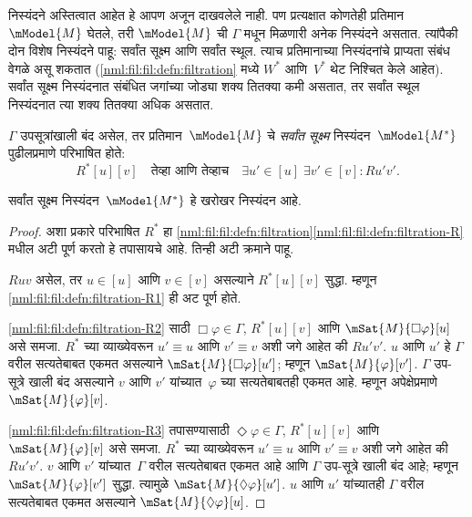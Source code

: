 निस्यंदने अस्तित्वात आहेत हे आपण अजून दाखवलेले नाही.
पण प्रत्यक्षात कोणतेही प्रतिमान~$\mModel{M}$ घेतले,
तरी $\mModel{M}$ ची $\Gamma$ मधून मिळणारी अनेक निस्यंदने असतात.
त्यांपैकी दोन विशेष निस्यंदने पाहू: सर्वांत सूक्ष्म
आणि सर्वांत स्थूल. त्याच प्रतिमानाच्या निस्यंदनांचे
प्राप्यता संबंध वेगळे असू शकतात
(\ref{nml:fil:fil:defn:filtration} मध्ये $W^*$ आणि~$V^*$
थेट निश्चित केले आहेत). सर्वांत सूक्ष्म निस्यंदनात
संबंधित जगांच्या जोड्या शक्य तितक्या कमी असतात,
तर सर्वांत स्थूल निस्यंदनात त्या शक्य तितक्या अधिक असतात.

\begin{defn}
  $\Gamma$ उपसूत्रांखाली बंद असेल, तर प्रतिमान~$\mModel{M}$
  चे \emph{सर्वांत सूक्ष्म} निस्यंदन~$\mModel{M^*}$ पुढीलप्रमाणे
  परिभाषित होते:
  \[  R^*[u][v] \quad \text{तेव्हा आणि तेव्हाच} \quad \exists u'\in [u] \;
  \exists v' \in [v] : Ru'v'.
  \]
\end{defn}

\begin{prop}\label{nml:fil:exf:prop:finest}
  सर्वांत सूक्ष्म निस्यंदन~$\mModel{M^*}$ हे खरोखर निस्यंदन आहे.
\end{prop}

\begin{proof}
  अशा प्रकारे परिभाषित $R^*$ हा
  \ref{nml:fil:fil:defn:filtration}\ref{nml:fil:fil:defn:filtration-R}
  मधील अटी पूर्ण करतो हे तपासायचे आहे. तिन्ही अटी क्रमाने पाहू.

  $Ruv$ असेल, तर $u \in [u]$ आणि $v \in [v]$ असल्याने
  $R^*[u][v]$ सुद्धा. म्हणून
  \ref{nml:fil:fil:defn:filtration-R1} ही अट पूर्ण होते.


        \ref{nml:fil:fil:defn:filtration-R2} साठी $\Box\varphi \in \Gamma$,
        $R^*[u][v]$ आणि $\mSat{M}{\Box\varphi}[u]$ असे समजा.
        $R^*$ च्या व्याख्येवरून $u' \equiv u$ आणि $v' \equiv v$
        अशी जगे आहेत की $Ru'v'$. $u$ आणि $u'$ हे $\Gamma$
        वरील सत्यतेबाबत एकमत असल्याने
        $\mSat{M}{\Box\varphi}[u']$; म्हणून $\mSat{M}{\varphi}[v']$.
        $\Gamma$ उप-सूत्रे खाली बंद असल्याने
        $v$ आणि $v'$ यांच्यात~$\varphi$ च्या सत्यतेबाबतही
        एकमत आहे. म्हणून अपेक्षेप्रमाणे $\mSat{M}{\varphi}[v]$.


        \ref{nml:fil:fil:defn:filtration-R3} तपासण्यासाठी
        $\Diamond\varphi \in \Gamma$, $R^*[u][v]$ आणि
        $\mSat{M}{\varphi}[v]$ असे समजा. $R^*$ च्या व्याख्येवरून
        $u' \equiv u$ आणि $v' \equiv v$ अशी जगे आहेत की
        $Ru'v'$. $v$ आणि $v'$ यांच्यात~$\Gamma$ वरील
        सत्यतेबाबत एकमत आहे आणि $\Gamma$ उप-सूत्रे
        खाली बंद आहे; म्हणून $\mSat{M}{\varphi}[v']$ सुद्धा.
        त्यामुळे $\mSat{M}{\Diamond \varphi}[u']$.
        $u$ आणि $u'$ यांच्यातही $\Gamma$ वरील
        सत्यतेबाबत एकमत असल्याने
        $\mSat{M}{\Diamond \varphi}[u]$.
\end{proof}



